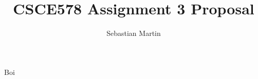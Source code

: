 \documentclass{article}
\title{
CSCE578 Assignment 3 Proposal
}
\author{Sebastian Martin}
\begin{document}
\maketitle

\begin{addmargin}[4em]{4em}
Boi
\end{addmargin}
\end{document}
